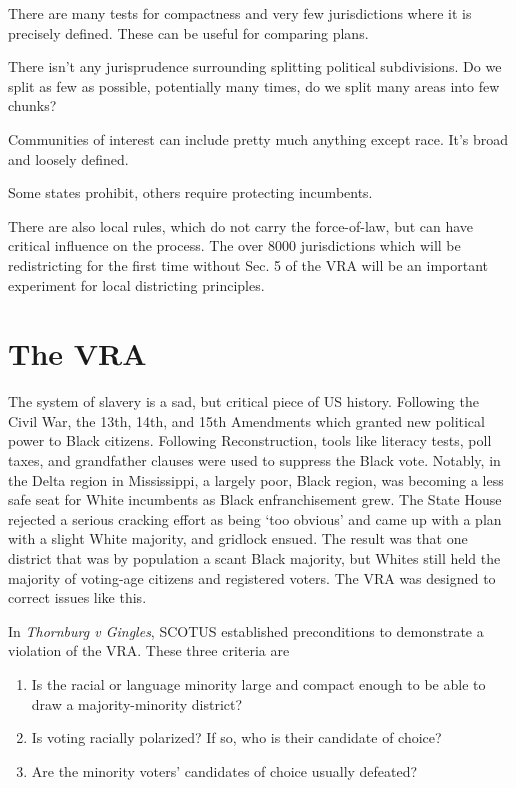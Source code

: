 There are many tests for compactness and very few jurisdictions where it is precisely defined.  These can be useful for comparing plans.

There isn't any jurisprudence surrounding splitting political subdivisions.  Do we split as few as possible, potentially many times, do we split many areas into few chunks?

Communities of interest can include pretty much anything except race.  It's broad and loosely defined.

Some states prohibit, others require protecting incumbents.

There are also local rules, which do not carry the force-of-law, but can have critical influence on the process.  The over 8000 jurisdictions which will be redistricting for the first time without Sec. 5 of the VRA will be an important experiment for local districting principles.

\section*{The VRA}

The system of slavery is a sad, but critical piece of US history.  Following the Civil War, the 13th, 14th, and 15th Amendments which granted new political power to Black citizens.  Following Reconstruction, tools like literacy tests, poll taxes, and grandfather clauses were used to suppress the Black vote.  Notably, in the Delta region in Mississippi, a largely poor, Black region, was becoming a less safe seat for White incumbents as Black enfranchisement grew.  The State House rejected a serious cracking effort as being `too obvious' and came up with a plan with a slight White majority, and gridlock ensued.  The result was that one district that was by population a scant Black majority, but Whites still held the majority of voting-age citizens and registered voters.  The VRA was designed to correct issues like this.


In \textit{Thornburg v Gingles}, SCOTUS established preconditions to demonstrate a violation of the VRA.  These three criteria are

\begin{enumerate}
	\item Is the racial or language minority large and compact enough to be able to draw a majority-minority district?
	\item Is voting racially polarized?  If so, who is their candidate of choice?
	\item Are the minority voters' candidates of choice usually defeated?
  \end{enumerate}
  

